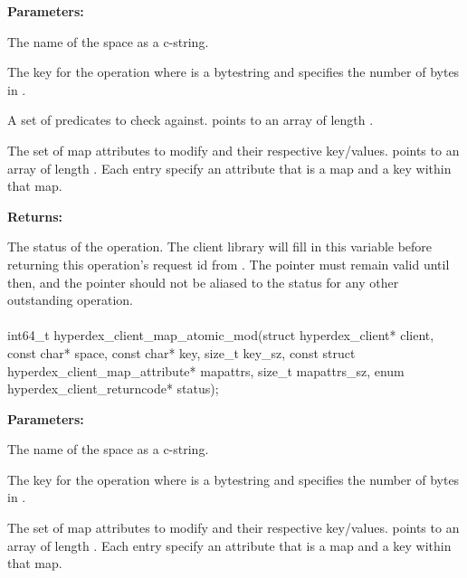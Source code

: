 \noindent\textbf{Parameters:}
\begin{description}[labelindent=\widthof{{\code{mapattrs}, \code{mapattrs\_sz}}},leftmargin=*,noitemsep,nolistsep,align=right]
\item[\code{space}] The name of the space as a c-string.
\item[\code{key}, \code{key\_sz}] The key for the operation where  is a bytestring and  specifies the number of bytes in .
\item[\code{checks}, \code{checks\_sz}] A set of predicates to check against.   points to an array of length .
\item[\code{mapattrs}, \code{mapattrs\_sz}] The set of map attributes to modify and their respective key/values.   points to an array of length .  Each entry specify an attribute that is a map and a key within that map.
\end{description}

\noindent\textbf{Returns:}
\begin{description}[labelindent=\widthof{{\code{status}}},leftmargin=*,noitemsep,nolistsep,align=right]
\item[\code{status}] The status of the operation.  The client library will fill in this variable before returning this operation's request id from .  The pointer must remain valid until then, and the pointer should not be aliased to the status for any other outstanding operation.
\end{description}

\paragraph{}
\begin{ccode}
int64_t hyperdex_client_map_atomic_mod(struct hyperdex_client* client,
                const char* space,
                const char* key, size_t key_sz,
                const struct hyperdex_client_map_attribute* mapattrs, size_t mapattrs_sz,
                enum hyperdex_client_returncode* status);
\end{ccode}
\funcdesc 

\noindent\textbf{Parameters:}
\begin{description}[labelindent=\widthof{{\code{mapattrs}, \code{mapattrs\_sz}}},leftmargin=*,noitemsep,nolistsep,align=right]
\item[\code{space}] The name of the space as a c-string.
\item[\code{key}, \code{key\_sz}] The key for the operation where  is a bytestring and  specifies the number of bytes in .
\item[\code{mapattrs}, \code{mapattrs\_sz}] The set of map attributes to modify and their respective key/values.   points to an array of length .  Each entry specify an attribute that is a map and a key within that map.
\end{description}

